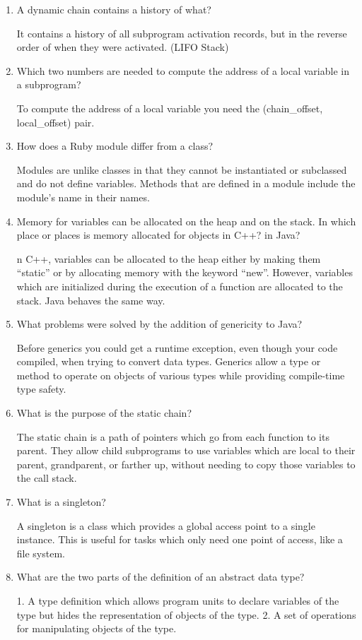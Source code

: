 \begin{enumerate}
\begin{answer}
\end{answer}
\item A dynamic chain contains a history of what?
\begin{answer}
It contains a history of all subprogram activation records, but in the reverse order of when they were activated. (LIFO Stack)
\end{answer}
\item Which two numbers are needed to compute
the address of a local variable in a subprogram?
\begin{answer}
To compute the address of a local variable you need the (chain\_offset, 
local\_offset) pair.
\end{answer}
\item How does a Ruby module differ from a class?
\begin{answer}
Modules are unlike classes in that they cannot be instantiated or subclassed
and do not define variables. Methods that are defined in a module include the
module’s name in their names.
\end{answer}
\item Memory for variables can be allocated on the heap
and on the stack. In which place or places is memory
allocated for objects in C++? in Java?
\begin{answer}
n C++, variables can be allocated to the heap either by making them “static” or by allocating memory with the keyword “new”. However, variables which are initialized during the execution of a function are allocated to the stack. Java behaves the same way.
\end{answer}
\item What problems were solved by the addition
of genericity to Java?
\begin{answer}
Before generics you could get a runtime exception, even though your code compiled, when trying to convert data types. Generics allow a type or method to operate on objects of various types while providing compile-time type safety.
\end{answer}
\item What is the purpose of the static chain?
\begin{answer}
The static chain is a path of pointers which go from each function to its parent. They allow child subprograms to use variables which are local to their parent, grandparent, or farther up, without needing to copy those variables to the call stack.
\end{answer}
\item What is a singleton?
\begin{answer}
A singleton is a class which provides a global access point to a single instance. This is useful for tasks which only need one point of access, like a file system.
\end{answer}
\item What are the two parts of the definition
of an abstract data type?
\begin{answer}
1. A type definition which allows program units to declare variables of the type but hides the representation of objects of the type. 2. A set of operations for manipulating objects of the type.
\end{answer}
\end{enumerate}
